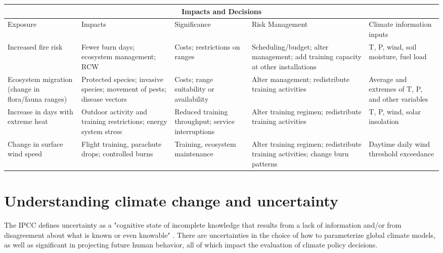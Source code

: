 \documentclass[10pt]{amsart}
\begin{document}
\begin{tabular}{ |p{2.5cm}|p{2.5cm}|p{2.5cm}|p{2.5cm}|p{2.5cm}| }
\hline
\multicolumn{5}{|c|}{Impacts and Decisions} \\
\hline
Exposure & Impacts & Significance & Risk Management & Climate information inputs \\
\hline
Increased fire risk & Fewer burn days; ecosystem management; RCW & Costs; restrictions on ranges & Scheduling/budget; alter management; add training capacity at other installations & T, P, wind, soil moisture, fuel load \\
\hline
Ecosystem migration (change in flora/fauna ranges) & Protected species; invasive species; movement of pests; disease vectors & Costs; range suitability or availability & Alter management; redistribute training activities & Average and extremes of T, P, and other variables \\
\hline
Increase in days with extreme heat & Outdoor activity and training restrictions; energy system stress & Reduced training throughput; service interruptions & Alter training regimen; redistribute training activities & T, P, wind, solar insolation \\
\hline
Change in surface wind speed & Flight training, parachute drops; controlled burns & Training, ecosystem maintenance & Alter training regimen; redistribute training activities; change burn patterns & Daytime daily wind threshold exceedance \\
\hline
\end{tabular}

\section{Understanding climate change and uncertainty}

The IPCC defines uncertainty as a "cognitive state of incomplete knowledge that results from a lack of information and/or from disagreement about what is known or even knowable" \parencite{kunreuther2014integrated}.
There are uncertainties in the choice of how to parameterize global climate models, as well as significant in projecting future human behavior, all of which impact the evaluation of climate policy decisions.
\end{document}
